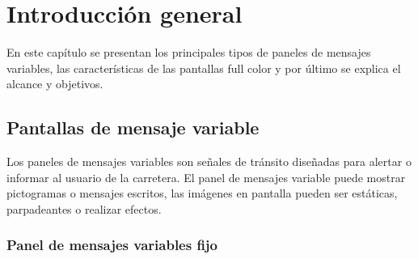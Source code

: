 
\chapter{Introducción general} %

\label{Chapter1} %
\label{IntroGeneral}
En este capítulo se presentan los principales tipos de paneles de mensajes variables, las características de las pantallas full color y por último se explica el alcance y objetivos.

\newcommand{\keyword}[1]{\textbf{#1}}
\newcommand{\tabhead}[1]{\textbf{#1}}
\newcommand{\code}[1]{\texttt{#1}}
\newcommand{\file}[1]{\texttt{\bfseries#1}}
\newcommand{\option}[1]{\texttt{\itshape#1}}
\newcommand{\grados}{$^{\circ}$}



\section{Pantallas de mensaje variable}

Los paneles de mensajes variables son señales de tránsito diseñadas para alertar o informar al usuario de la carretera. El panel de mensajes variable puede mostrar pictogramas o mensajes escritos, las imágenes en pantalla pueden ser estáticas, parpadeantes o realizar efectos\cite{WIKIVMS}.

\subsection{Panel de mensajes variables fijo}

